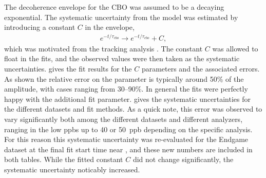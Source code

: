 The decoherence envelope for the CBO was assumed to be a decaying exponential. The systematic uncertainty from the model was estimated by introducing a constant $C$ in the envelope,
    \begin{align}
        e^{-t/\tau_{cbo}} \rightarrow e^{-t/\tau_{cbo}} + C,
    \end{align}
which was motivated from the tracking analysis \cite{phdthesis:2020Kinnaird}. The constant $C$ was allowed to float in the fits, and the observed \DR values were then taken as the systematic uncertainties.  gives the fit results for the $C$ parameters and the associated errors. As shown the relative error on the parameter is typically around 50\% of the amplitude, with cases ranging from 30--90\%. In general the fits were perfectly happy with the additional fit parameter.  gives the systematic uncertainties for the different datasets and fit methods. As a quick note, this error was observed to vary significantly both among the different datasets and different analyzers, ranging in the low ppbs up to 40 or 50~ppb depending on the specific analysis. For this reason this systematic uncertainty was re-evaluated for the Endgame dataset at the final fit start time near , and these new numbers are included in both tables. While the fitted constant $C$ did not change significantly, the systematic uncertainty noticably increased.


